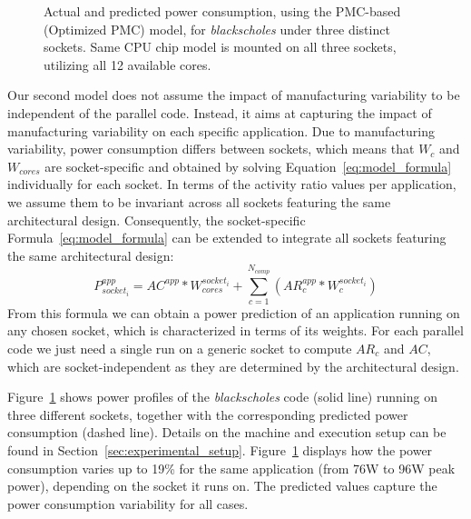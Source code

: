 \begin{figure}[ht!]
	\caption{Actual and predicted power consumption, using the PMC-based (Optimized PMC)
model, for \textit{blackscholes} under three distinct sockets. Same CPU chip model is
mounted on all three sockets, utilizing all 12 available cores.}
	\label{fig:prediction_eval}
\end{figure}

\par
Our second model does not assume the impact of manufacturing variability to be independent of the parallel code. 
Instead, it aims at capturing the impact of manufacturing variability on each specific application.
Due to manufacturing
variability, power consumption differs between sockets, which means that  $W_c$ and
$W_{cores}$ are socket-specific and obtained by solving Equation~\ref{eq:model_formula}
individually for each socket.  In terms of the activity ratio values per application, we
assume them to be invariant across all sockets featuring the same architectural design.
Consequently, the socket-specific Formula~\ref{eq:model_formula} can be extended to
integrate all sockets featuring the same architectural design: 
\begin{equation}
	\label{eq:model_variability_formula}
	P_{socket_i}^{app} = AC^{app} * W_{cores}^{socket_i} + \sum_{c=1}^{N_{comp}} ( AR_c^{app} * W_c^{socket_i} )
\end{equation}
From this formula we can obtain a power prediction of an application running on any chosen
socket, which is characterized in terms of its weights.  For each parallel code we just
need a single run on a generic socket to compute $AR_c$ and $AC$, which are
socket-independent as they are determined by the architectural design.
\par
Figure~\ref{fig:prediction_eval} shows power profiles of the \textit{blackscholes} code
(solid line) running on three different sockets, together with the corresponding predicted
power consumption (dashed line).  Details on the machine and execution setup can be found
in Section~\ref{sec:experimental_setup}.  Figure~\ref{fig:prediction_eval} displays how
the power consumption varies up to 19\% for the same application (from 76W to 96W peak
power), depending on the socket it runs on.  The predicted values capture the power
consumption variability for all cases. 

